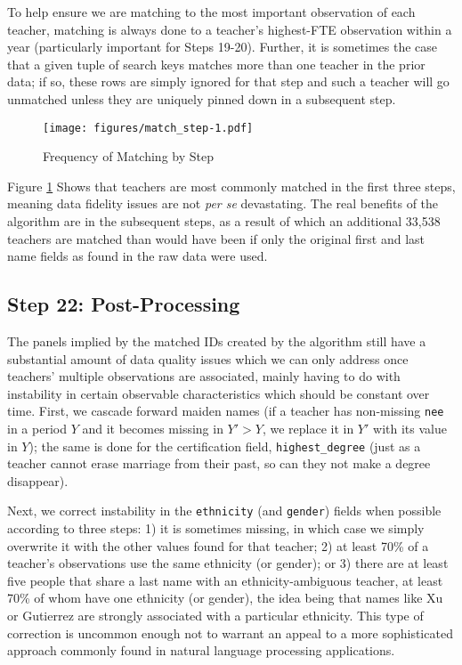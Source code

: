 \documentclass[12pt,]{article}
\begin{document}
To help ensure we are matching to the most important observation of each
teacher, matching is always done to a teacher's highest-FTE observation
within a year (particularly important for Steps 19-20). Further, it is
sometimes the case that a given tuple of search keys matches more than
one teacher in the prior data; if so, these rows are simply ignored for
that step and such a teacher will go unmatched unless they are uniquely
pinned down in a subsequent step.

\begin{figure}[htbp]
\centering
\texttt{[image: figures/match\_step-1.pdf]}
\caption{\label{fig:step}Frequency of Matching by Step}
\end{figure}

Figure \ref{fig:step} Shows that teachers are most commonly matched in
the first three steps, meaning data fidelity issues are not \emph{per
se} devastating. The real benefits of the algorithm are in the
subsequent steps, as a result of which an additional 33,538 teachers are
matched than would have been if only the original first and last name
fields as found in the raw data were used.

\subsection{Step 22: Post-Processing}\label{step-22-post-processing}

The panels implied by the matched IDs created by the algorithm still
have a substantial amount of data quality issues which we can only
address once teachers' multiple observations are associated, mainly
having to do with instability in certain observable characteristics
which should be constant over time. First, we cascade forward maiden
names (if a teacher has non-missing \texttt{nee} in a period \(Y\) and
it becomes missing in \(Y'>Y\), we replace it in \(Y'\) with its value
in \(Y\)); the same is done for the certification field,
\texttt{highest\_degree} (just as a teacher cannot erase marriage from
their past, so can they not make a degree disappear).

Next, we correct instability in the \texttt{ethnicity} (and
\texttt{gender}) fields when possible according to three steps: 1) it is
sometimes missing, in which case we simply overwrite it with the other
values found for that teacher; 2) at least 70\% of a teacher's
observations use the same ethnicity (or gender); or 3) there are at
least five people that share a last name with an ethnicity-ambiguous
teacher, at least 70\% of whom have one ethnicity (or gender), the idea
being that names like Xu or Gutierrez are strongly associated with a
particular ethnicity. This type of correction is uncommon enough not to
warrant an appeal to a more sophisticated approach commonly found in
natural language processing applications.
\end{document}
